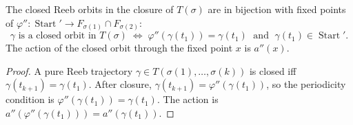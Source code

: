 \begin{lemma}\label{lem:fixed-point}
The closed Reeb orbits in the closure of $T(\sigma)$ are in bijection with
fixed points of $\varphi'' \colon \operatorname{Start}' \to F_{\sigma(1)} \cap F_{\sigma(2)}$:
\[
  \gamma \text{ is a closed orbit in } T(\sigma)
  \;\Longleftrightarrow\;
  \varphi''(\gamma(t_1)) = \gamma(t_1)
  \;\text{ and }\;
  \gamma(t_1) \in \operatorname{Start}'.
\]
The action of the closed orbit through the fixed point $x$ is $a''(x)$.
\end{lemma}

\begin{proof}
A pure Reeb trajectory $\gamma \in T(\sigma(1), \ldots, \sigma(k))$ is closed
iff $\gamma(t_{k+1}) = \gamma(t_1)$.
After closure, $\gamma(t_{k+1}) = \varphi''(\gamma(t_1))$,
so the periodicity condition is $\varphi''(\gamma(t_1)) = \gamma(t_1)$.
The action is $a''(\varphi''(\gamma(t_1))) = a''(\gamma(t_1))$.
\end{proof}

